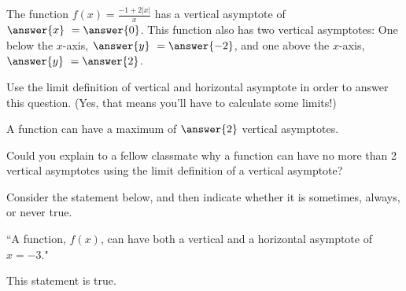 \documentclass[handout]{ximera}
\begin{document}
\begin{exercise}

The function $f(x) = \frac{-1 + 2|x|}{x}$ has a vertical asymptote of $\answer{x} \ = \answer{0}$.  This function also has two vertical asymptotes: One below the $x$-axis, $\answer{y} \ = \answer{-2}$, and one above the $x$-axis, $\answer{y} \ = \answer{2}$.  

\begin{hint}

Use the limit definition of vertical and horizontal asymptote in order to answer this question.  (Yes, that means you'll have to calculate some limits!)

\end{hint}

\end{exercise}

\begin{exercise}

A function can have a maximum of $\answer{2}$ vertical asymptotes.  

\begin{feedback}[correct]

Could you explain to a fellow classmate why a function can have no more than 2 vertical asymptotes using the limit definition of a vertical asymptote?  

\end{feedback}

\end{exercise}

\begin{exercise}

Consider the statement below, and then indicate whether it is sometimes, always, or never true.

\begin{center} ``A function, $f(x)$, can have both a vertical and a horizontal asymptote of $x=-3$." \end{center}

This statement is  true.

\end{exercise}
\end{document}
